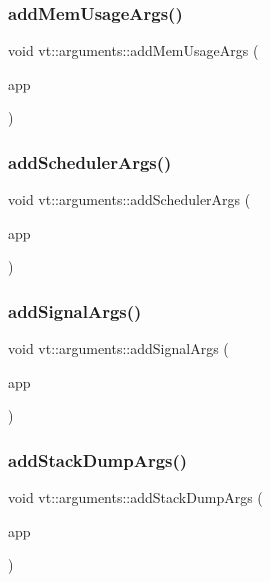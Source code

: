 \subsubsection{\texorpdfstring{add\+Mem\+Usage\+Args()}{addMemUsageArgs()}}
{\footnotesize\ttfamily void vt\+::arguments\+::add\+Mem\+Usage\+Args (\begin{DoxyParamCaption}\item[{C\+L\+I\+::\+App \&}]{app }\end{DoxyParamCaption})}

\mbox{\label{namespacevt_1_1arguments_a586a9f239bd236bf2bc6ec02b1290fcc}} 
\subsubsection{\texorpdfstring{add\+Scheduler\+Args()}{addSchedulerArgs()}}
{\footnotesize\ttfamily void vt\+::arguments\+::add\+Scheduler\+Args (\begin{DoxyParamCaption}\item[{C\+L\+I\+::\+App \&}]{app }\end{DoxyParamCaption})}

\mbox{\label{namespacevt_1_1arguments_a61af811ee1284bef96edef93a52792c4}} 
\subsubsection{\texorpdfstring{add\+Signal\+Args()}{addSignalArgs()}}
{\footnotesize\ttfamily void vt\+::arguments\+::add\+Signal\+Args (\begin{DoxyParamCaption}\item[{C\+L\+I\+::\+App \&}]{app }\end{DoxyParamCaption})}

\mbox{\label{namespacevt_1_1arguments_a98bea139ecaff54e0b2b03afeba5a6a1}} 
\subsubsection{\texorpdfstring{add\+Stack\+Dump\+Args()}{addStackDumpArgs()}}
{\footnotesize\ttfamily void vt\+::arguments\+::add\+Stack\+Dump\+Args (\begin{DoxyParamCaption}\item[{C\+L\+I\+::\+App \&}]{app }\end{DoxyParamCaption})}

